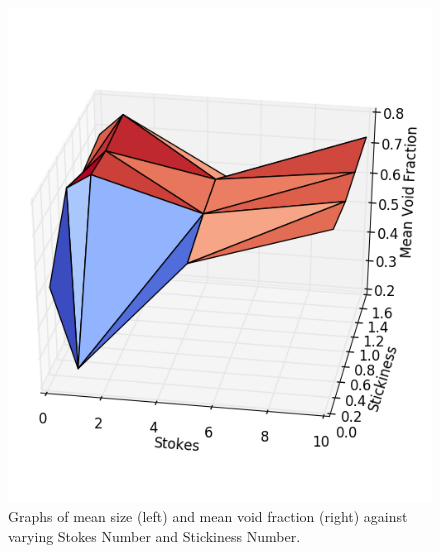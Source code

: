 \documentclass[a4paper,11pt,titlepage]{report}
\begin{document}
\begin{figure}[!htb]
\includegraphics[scale=0.5]{figures/analysis/void_fraction_3d.png}
\caption{Graphs of mean size (left) and mean void fraction (right) against varying Stokes Number and Stickiness Number.}
\label{fig:mean size 3d}
\end{figure}
\end{document}
